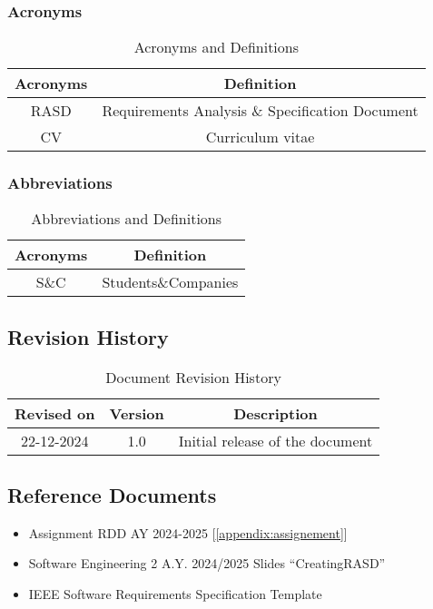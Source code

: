 \subsubsection{Acronyms}
\begin{table}[h]
    \centering
\begin{tabular}{|c|c|}
        \hline
        \textbf{Acronyms} & \textbf{Definition} \\ \hline
        RASD & Requirements Analysis \& Specification Document\\ \hline
        CV & Curriculum vitae\\ \hline
    \end{tabular}
    \caption{Acronyms and Definitions}
    \label{tab:acronyms}
\end{table}

\subsubsection{Abbreviations}
\begin{table}[h]
    \centering
\begin{tabular}{|c|c|}
        \hline
        \textbf{Acronyms} & \textbf{Definition} \\ \hline
        S\&C & Students\&Companies \\ \hline
    \end{tabular}
    \caption{Abbreviations and Definitions}
    \label{tab:abbreviations}
\end{table}

\subsection{Revision History}
\begin{table}[h]
    \centering
    \begin{tabular}{|c|c|c|}
        \hline
        \textbf{Revised on} & \textbf{Version} & \textbf{Description}\\ \hline
        22-12-2024 & 1.0     & Initial release of the document \\ \hline
    \end{tabular}
    \caption{Document Revision History}
    \label{tab:revision_history_table}
\end{table}

\subsection{Reference Documents}
\begin{itemize}
  \item Assignment RDD AY 2024-2025 [\ref{appendix:assignement}]
  \item Software Engineering 2 A.Y. 2024/2025 Slides “CreatingRASD” 
  \item IEEE Software Requirements Specification Template \cite{720574}

\end{itemize}


